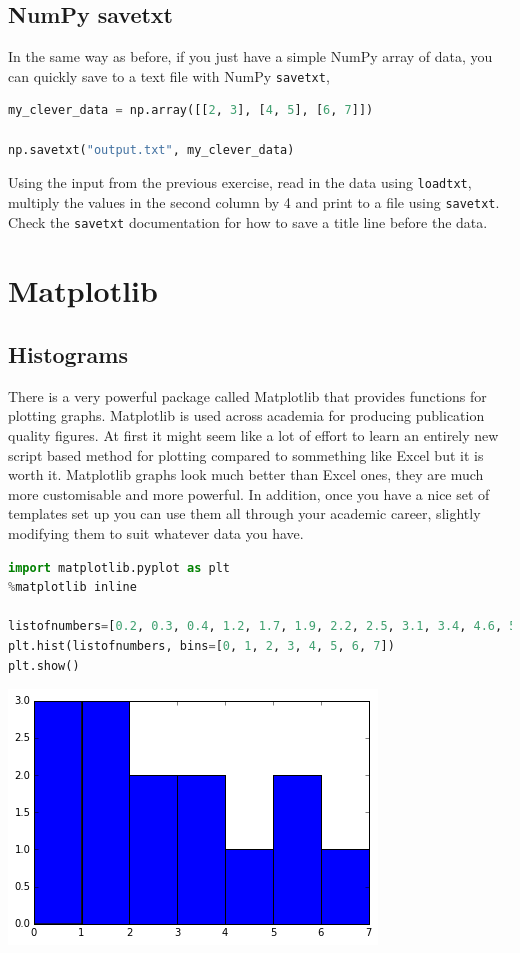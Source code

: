 	\subsection{NumPy savetxt}
		In the same way as before, if you just have a simple NumPy array of data, you can quickly save to a text file with NumPy \texttt{savetxt},
		\begin{lstlisting}[language=Python]
my_clever_data = np.array([[2, 3], [4, 5], [6, 7]])

np.savetxt("output.txt", my_clever_data)\end{lstlisting}

\begin{task}Using the input from the previous exercise, read in the data using \texttt{loadtxt}, multiply the values in the second column by 4 and print to a file using \texttt{savetxt}. Check the \texttt{savetxt} documentation for how to save a title line before the data.\end{task}

\section{Matplotlib}
	\subsection{Histograms}
		There is a very powerful package called Matplotlib that provides functions for plotting graphs. Matplotlib is used across academia for producing publication quality figures. At first it might seem like a lot of effort to learn an entirely new script based method for plotting compared to sommething like Excel but it is worth it. Matplotlib graphs look much better than Excel ones, they are much more customisable and more powerful. In addition, once you have a nice set of templates set up you can use them all through your academic career, slightly modifying them to suit whatever data you have.
		\begin{lstlisting}[language=Python]
import matplotlib.pyplot as plt
%matplotlib inline

listofnumbers=[0.2, 0.3, 0.4, 1.2, 1.7, 1.9, 2.2, 2.5, 3.1, 3.4, 4.6, 5.1, 5.6, 6.0, 7.4, 7.4, 7.6]
plt.hist(listofnumbers, bins=[0, 1, 2, 3, 4, 5, 6, 7])
plt.show()\end{lstlisting}
		\includegraphics[scale=0.8]{images/histogram}

